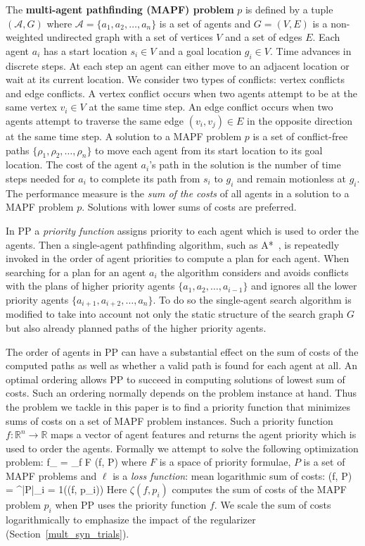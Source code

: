 The \textbf{multi-agent pathfinding (MAPF) problem} $ p $ is defined by a tuple $ (\mathcal{A}, G) $ where $ \mathcal{A} = \{a_1, a_2, \dots, a_n\} $ is a set of agents and $ G = (V, E) $ is a non-weighted undirected graph with a set of vertices $ V $ and a set of edges $ E $. Each agent $ a_i $ has a start location $ s_i \in V $ and a goal location $ g_i \in V $. Time advances in discrete steps. At each step an agent can either move to an adjacent location or wait at its current location. We consider two types of conflicts: vertex conflicts and edge conflicts. A vertex conflict occurs when two agents attempt to be at the same vertex $ v_i \in V $ at the same time step. An edge conflict occurs when two agents attempt to traverse the same edge $ (v_i, v_j) \in E $ in the opposite direction at the same time step. A solution to a MAPF problem $ p $ is a set of conflict-free paths $ \{\rho_1, \rho_2, \dots, \rho_n\} $ to move each agent from its start location to its goal location. The cost of the agent $ a_i $'s path in the solution is the number of time steps needed for $ a_i $ to complete its path from $ s_i $ to $ g_i $ and remain motionless at $ g_i $. The performance measure is the {\em sum of the costs} of all agents in a solution to a MAPF problem $ p $. Solutions with lower sums of costs are preferred.

In PP a \emph{priority function} assigns priority to each agent which is used to order the agents. Then a single-agent pathfinding algorithm, such as A*~\citep{AStar}, is repeatedly invoked in the order of agent priorities to compute a plan for each agent. When searching for a plan for an agent $ a_i $ the algorithm considers and avoids conflicts with the plans of higher priority agents $ \{a_1, a_2, \dots, a_{i - 1}\} $ and ignores all the lower priority agents $ \{a_{i + 1}, a_{i+2}, \dots, a_n\} $. To do so the single-agent search algorithm is modified to take into account not only the static structure of the search graph $ G $ but also already planned paths of the higher priority agents.

The order of agents in PP can have a substantial effect on the sum of costs of the computed paths as well as whether a valid path is found for each agent at all. An optimal ordering allows PP to succeed in computing solutions of lowest sum of costs. Such an ordering normally depends on the problem instance at hand. Thus the problem we tackle in this paper is to find a priority function that minimizes sums of costs on a set of MAPF problem instances. Such a  priority function $ f : \mathbb{R}^n \rightarrow \mathbb{R} $ maps a vector of agent features and returns the agent priority which is used to order the agents. Formally we attempt to solve the following optimization problem:
\bea
f_{\min} = \argmin_{f \in F} \ell(f, P)
\eea
where $ F $ is a space of priority formulae, $ P $ is a set of MAPF problems and $ \ell $ is a \textit{loss function}: mean logarithmic sum of costs:
\bea
\label{eq:loss}
{
\ell(f, P) =  \sum^{|P|}_{i = 1}\ln(\zeta(f, p_i))
}
\eea
Here $\zeta(f, p_i)$ computes the sum of costs of the MAPF problem $ p_i $ when PP uses the priority function $ f $. We scale the sum of costs logarithmically to emphasize the impact  of the regularizer (Section~\ref{mult_syn_trials}).

